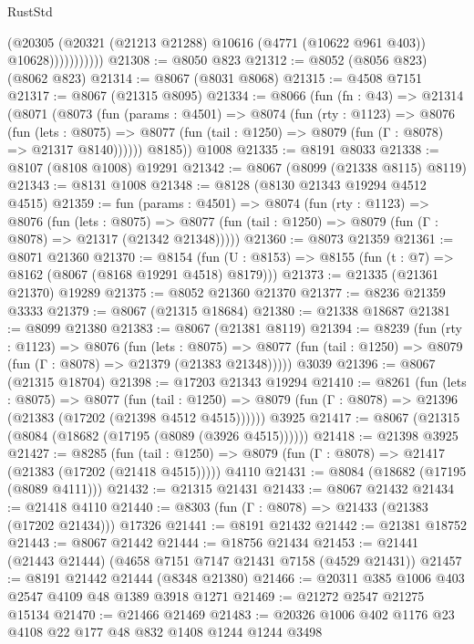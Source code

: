 \begin{lexlean}{RustStd}
\begin{coremodule}
                      (@20305
                        (@20321 (@21213 @21288) @10616 (@4771 (@10622 @961 @403)) @10628)))))))))))
@21308 := @8050 @823
@21312 := @8052 (@8056 @823) (@8062 @823)
@21314 := @8067 (@8031 @8068)
@21315 := @4508 @7151
@21317 := @8067 (@21315 @8095)
@21334 := @8066
    (fun (fn : @43) =>
    @21314
      (@8071
        (@8073
          (fun (params : @4501) =>
          @8074
            (fun (rty : @1123) =>
            @8076
              (fun (lets : @8075) =>
              @8077 (fun (tail : @1250) => @8079 (fun (Γ : @8078) => @21317 @8140))))))
        @8185))
    @1008
@21335 := @8191 @8033
@21338 := @8107 (@8108 @1008) @19291
@21342 := @8067 (@8099 (@21338 @8115) @8119)
@21343 := @8131 @1008
@21348 := @8128 (@8130 @21343 @19294 @4512 @4515)
@21359 := fun (params : @4501) =>
  @8074
    (fun (rty : @1123) =>
    @8076
      (fun (lets : @8075) =>
      @8077 (fun (tail : @1250) => @8079 (fun (Γ : @8078) => @21317 (@21342 @21348)))))
@21360 := @8073 @21359
@21361 := @8071 @21360
@21370 := @8154
    (fun (U : @8153) => @8155 (fun (t : @7) => @8162 (@8067 (@8168 @19291 @4518) @8179)))
@21373 := @21335 (@21361 @21370) @19289
@21375 := @8052 @21360 @21370
@21377 := @8236 @21359 @3333
@21379 := @8067 (@21315 @18684)
@21380 := @21338 @18687
@21381 := @8099 @21380
@21383 := @8067 (@21381 @8119)
@21394 := @8239
    (fun (rty : @1123) =>
    @8076
      (fun (lets : @8075) =>
      @8077 (fun (tail : @1250) => @8079 (fun (Γ : @8078) => @21379 (@21383 @21348)))))
    @3039
@21396 := @8067 (@21315 @18704)
@21398 := @17203 @21343 @19294
@21410 := @8261
    (fun (lets : @8075) =>
    @8077
      (fun (tail : @1250) =>
      @8079 (fun (Γ : @8078) => @21396 (@21383 (@17202 (@21398 @4512 @4515))))))
    @3925
@21417 := @8067 (@21315 (@8084 (@18682 (@17195 (@8089 (@3926 @4515))))))
@21418 := @21398 @3925
@21427 := @8285
    (fun (tail : @1250) => @8079 (fun (Γ : @8078) => @21417 (@21383 (@17202 (@21418 @4515)))))
    @4110
@21431 := @8084 (@18682 (@17195 (@8089 @4111)))
@21432 := @21315 @21431
@21433 := @8067 @21432
@21434 := @21418 @4110
@21440 := @8303 (fun (Γ : @8078) => @21433 (@21383 (@17202 @21434))) @17326
@21441 := @8191 @21432
@21442 := @21381 @18752
@21443 := @8067 @21442
@21444 := @18756 @21434
@21453 := @21441 (@21443 @21444) (@4658 @7151 @7147 @21431 @7158 (@4529 @21431))
@21457 := @8191 @21442 @21444 (@8348 @21380)
@21466 := @20311 @385 @1006 @403 @2547 @4109 @48 @1389 @3918 @1271
@21469 := @21272 @2547 @21275 @15134
@21470 := @21466 @21469
@21483 := @20326 @1006 @402 @1176 @23 @4108 @22 @177 @48 @832 @1408 @1244 @1244 @3498

\end{coremodule}
\end{lexlean}
